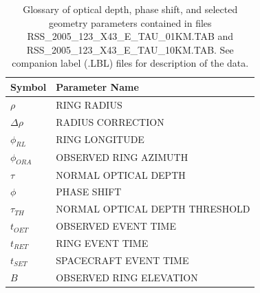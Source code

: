 \documentclass[crop=false,class=book]{standalone}
\begin{document}
\begin{table}[H]
    \centering
    \begin{tabular}{l l}
        \hline
        Symbol			& Parameter Name \\
        \hline
        $\rho$			& RING RADIUS \\
        $\Delta\rho$		& RADIUS CORRECTION \\
        $\phi_{RL}$		& RING LONGITUDE \\
        $\phi_{ORA}$		& OBSERVED RING AZIMUTH \\
        $\tau$			& NORMAL OPTICAL DEPTH \\
        $\phi$			& PHASE SHIFT \\
        $\tau_{TH}$		& NORMAL OPTICAL DEPTH THRESHOLD \\
        $t_{OET}$			& OBSERVED EVENT TIME \\
        $t_{RET}$			& RING EVENT TIME \\
        $t_{SET}$			& SPACECRAFT EVENT TIME \\
        $B$				& OBSERVED RING ELEVATION \\
        \hline
    \end{tabular}
    \caption[Glossary of Parameters in Tau File]{Glossary of optical depth, phase shift, and selected geometry parameters contained in files RSS\_2005\_123\_X43\_E\_TAU\_01KM.TAB and RSS\_2005\_123\_X43\_E\_TAU\_10KM.TAB. See companion label (.LBL) files for description of the data.}
    \label{tab:easydata_parameters_from_tau_file}
\end{table}
\end{document}
